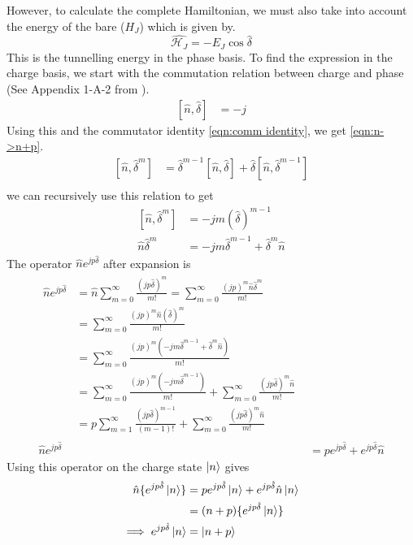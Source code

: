 However, to calculate the complete Hamiltonian, we must also take into account the energy of the bare \JJ ($H_J$) which is given by.
\begin{equation}
\hat{\mathcal{H}_J}=-E_J\cos\hat{\delta}
\end{equation}
This is the tunnelling energy in the phase basis. To find the expression in the charge basis, we start with the commutation relation between charge and phase (See Appendix 1-A-2 from \cite{Cottet2002d}).
\begin{align}
\left[\hat{n},\hat{\delta}\right]&=-j
\end{align}
Using this and the commutator identity \ref{eqn:comm identity}, we get \ref{eqn:n->n+p}.
\begin{align}
\left[\hat{n},\hat{\delta}^m\right]&=\hat{\delta}^{m-1}\left[\hat{n},\hat{\delta}\right]+\hat{\delta}\left[\hat{n},\hat{\delta}^{m-1}\right]
\label{eqn:comm identity}\\
\end{align}
we can recursively use this relation to get
\begin{align}
\left[\hat{n},\hat{\delta}^m\right]&=-jm(\hat{\delta})^{m-1}\\
\hat{n}\hat{\delta}^m&=-jm\hat{\delta}^{m-1}+\hat{\delta}^m\hat{n}
\end{align}
The operator $\hat{n}e^{jp\hat{\delta}}$ after expansion is
\begin{align}
\begin{split}
\hat{n}e^{jp\hat{\delta}}&=\hat{n}\sum_{m=0}^\infty \frac{( jp\hat{\delta})^m}{m!}=\sum_{m=0}^\infty \frac{(jp)^m\hat{n}\hat{\delta}^m}{m!}\\
&=\sum_{m=0}^\infty \frac{(jp)^m\hat{n}(\hat{\delta})^m}{m!}\\
&=\sum_{m=0}^\infty \frac{(jp)^m(-jm\hat{\delta}^{m-1}+\hat{\delta}^m\hat{n})}{m!}\\
&=\sum_{m=0}^\infty \frac{(jp)^m(-jm\hat{\delta}^{m-1})}{m!}+\sum_{m=0}^\infty \frac{(jp\hat{\delta})^m\hat{n}}{m!}\\
&=p\sum_{m=1}^\infty \frac{(jp\hat{\delta})^{m-1}}{(m-1)!}+\sum_{m=0}^\infty \frac{(jp\hat{\delta})^m\hat{n}}{m!}
\end{split}\\
\hat{n}e^{jp\hat{\delta}}&=pe^{jp\hat{\delta}}+e^{jp\hat{\delta}}\hat{n}
\end{align}
Using this operator on the charge state $\ket{n}$ gives
\begin{align}
\hat{n}\lbrace e^{jp\hat{\delta}}\ket{n}\rbrace&=pe^{jp\hat{\delta}}\ket{n}+e^{jp\hat{\delta}}\hat{n}\ket{n}\\
&=(n+p)\lbrace e^{jp\hat{\delta}}\ket{n}\rbrace\\
\implies e^{jp\hat{\delta}}\ket{n}&=\ket{n+p}
\end{align}
